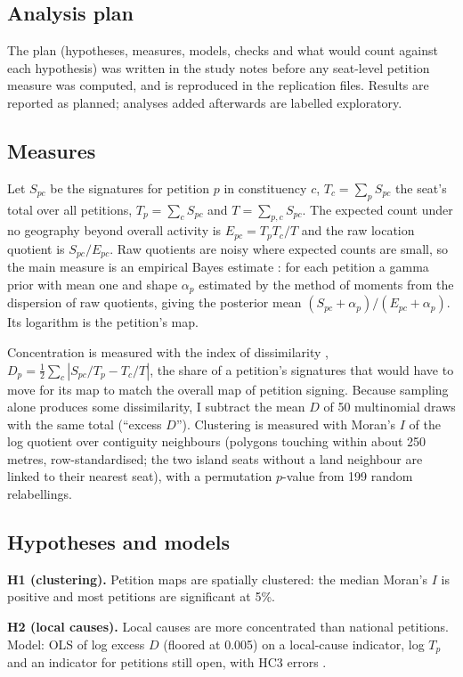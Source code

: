 \documentclass[11pt,a4paper]{article}
\begin{document}
\subsection{Analysis plan}
The plan (hypotheses, measures, models, checks and what would count against each hypothesis) was written in the study notes before any seat-level petition measure was computed, and is reproduced in the replication files. Results are reported as planned; analyses added afterwards are labelled exploratory.

\subsection{Measures}
Let $S_{pc}$ be the signatures for petition $p$ in constituency $c$, $T_c=\sum_p S_{pc}$ the seat's total over all petitions, $T_p=\sum_c S_{pc}$ and $T=\sum_{p,c}S_{pc}$. The expected count under no geography beyond overall activity is $E_{pc}=T_pT_c/T$ and the raw location quotient is $S_{pc}/E_{pc}$. Raw quotients are noisy where expected counts are small, so the main measure is an empirical Bayes estimate \citep{claytonkaldor1987}: for each petition a gamma prior with mean one and shape $\alpha_p$ estimated by the method of moments from the dispersion of raw quotients, giving the posterior mean $(S_{pc}+\alpha_p)/(E_{pc}+\alpha_p)$. Its logarithm is the petition's map.

Concentration is measured with the index of dissimilarity \citep{duncan1955}, $D_p=\tfrac12\sum_c|S_{pc}/T_p-T_c/T|$, the share of a petition's signatures that would have to move for its map to match the overall map of petition signing. Because sampling alone produces some dissimilarity, I subtract the mean $D$ of 50 multinomial draws with the same total (``excess $D$''). Clustering is measured with Moran's $I$ \citep{moran1950,anselin1995} of the log quotient over contiguity neighbours (polygons touching within about 250 metres, row-standardised; the two island seats without a land neighbour are linked to their nearest seat), with a permutation $p$-value from 199 random relabellings.

\subsection{Hypotheses and models}
\textbf{H1 (clustering).} Petition maps are spatially clustered: the median Moran's $I$ is positive and most petitions are significant at 5\%.

\textbf{H2 (local causes).} Local causes are more concentrated than national petitions. Model: OLS of log excess $D$ (floored at 0.005) on a local-cause indicator, log $T_p$ and an indicator for petitions still open, with HC3 errors \citep{mackinnon1985}.
\end{document}
